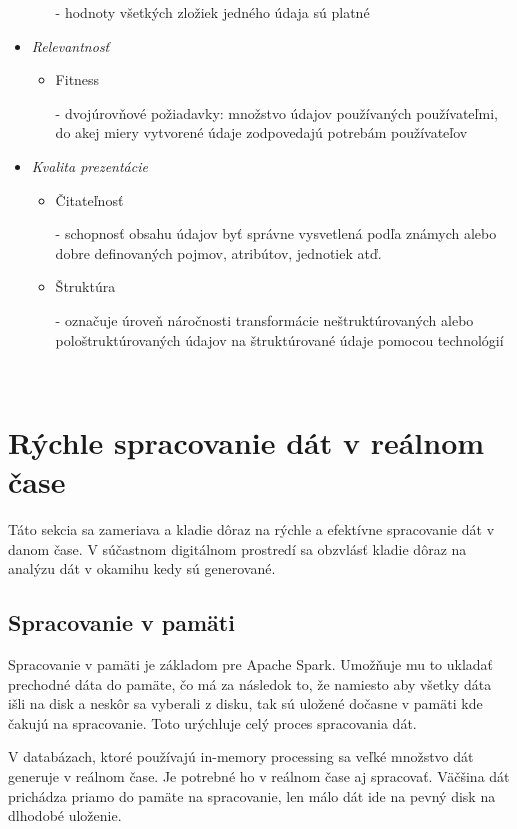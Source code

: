 \documentclass[10pt,slovak,a4paper]{article}
\begin{document}
\begin{itemize}
\begin{itemize}
	- hodnoty všetkých zložiek jedného údaja sú platné
	\end{itemize}
\item \emph {Relevantnosť}
	\begin{itemize}
	\item Fitness

	- dvojúrovňové požiadavky: množstvo údajov používaných používateľmi, do akej miery vytvorené údaje zodpovedajú potrebám používateľov
	\end{itemize}
\item \emph {Kvalita prezentácie}
	\begin{itemize}
	\item Čitateľnosť

	- schopnosť obsahu údajov byť správne vysvetlená podľa známych alebo dobre definovaných pojmov, atribútov, jednotiek atď.
	\item Štruktúra

	- označuje úroveň náročnosti transformácie neštruktúrovaných alebo pološtruktúrovaných údajov na štruktúrované údaje pomocou technológií 
	\end{itemize}
\end{itemize}

~\cite{Metrics}


\section {Rýchle spracovanie dát v reálnom čase} \label{RychleSpracovanie}

Táto sekcia sa zameriava a kladie dôraz na rýchle a efektívne spracovanie dát v danom čase. V súčastnom digitálnom prostredí sa obzvlásť kladie dôraz na analýzu dát v okamihu kedy sú generované.

\subsection {Spracovanie v pamäti} \label{InMemory}

Spracovanie v pamäti je základom pre Apache Spark. Umožňuje mu to ukladať prechodné dáta do pamäte, čo má za následok to, že namiesto aby všetky dáta išli na disk a neskôr sa vyberali z disku, tak sú uložené dočasne v pamäti kde čakujú na spracovanie. Toto urýchluje celý proces spracovania dát.~\cite{Apache}

V databázach, ktoré používajú in-memory processing sa veľké množstvo dát generuje v reálnom čase. Je potrebné ho v reálnom čase aj spracovať. Väčšina dát prichádza priamo do pamäte na spracovanie, len málo dát ide na pevný disk na dlhodobé uloženie. ~\cite{InMemoryArticle}
\end{document}
